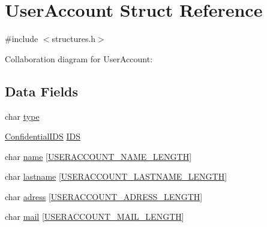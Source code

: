 \hypertarget{struct_user_account}{\section{User\-Account Struct Reference}
\label{struct_user_account}
}


{\ttfamily \#include $<$structures.\-h$>$}



Collaboration diagram for User\-Account\-:
\subsection*{Data Fields}
\begin{DoxyCompactItemize}
\item 
char \hyperlink{struct_user_account_aff17911edc8208aa8ddb1c7c52c78389}{type}
\item 
\hyperlink{struct_confidential_i_d_s}{Confidential\-I\-D\-S} \hyperlink{struct_user_account_a588d1e5ad85c65bc2b00e9432faadc0e}{I\-D\-S}
\item 
char \hyperlink{struct_user_account_ab3f0e8a7b7c292feb10bb01486452533}{name} \mbox{[}\hyperlink{defines_8h_a19e07c697a90c76dc929a297b857f607}{U\-S\-E\-R\-A\-C\-C\-O\-U\-N\-T\-\_\-\-N\-A\-M\-E\-\_\-\-L\-E\-N\-G\-T\-H}\mbox{]}
\item 
char \hyperlink{struct_user_account_a570366d76c40b10dee4a3db834bc53be}{lastname} \mbox{[}\hyperlink{defines_8h_af504a907ef57172c931bd86960095678}{U\-S\-E\-R\-A\-C\-C\-O\-U\-N\-T\-\_\-\-L\-A\-S\-T\-N\-A\-M\-E\-\_\-\-L\-E\-N\-G\-T\-H}\mbox{]}
\item 
char \hyperlink{struct_user_account_accd59deb6270e807cd96a582c141e631}{adress} \mbox{[}\hyperlink{defines_8h_adebc02c1bf42467bc097c05dfe461dc5}{U\-S\-E\-R\-A\-C\-C\-O\-U\-N\-T\-\_\-\-A\-D\-R\-E\-S\-S\-\_\-\-L\-E\-N\-G\-T\-H}\mbox{]}
\item 
char \hyperlink{struct_user_account_aa9bbf7bea4117b927642aee2875821d9}{mail} \mbox{[}\hyperlink{defines_8h_ab707ed00c5341acd2f33edf23891c34e}{U\-S\-E\-R\-A\-C\-C\-O\-U\-N\-T\-\_\-\-M\-A\-I\-L\-\_\-\-L\-E\-N\-G\-T\-H}\mbox{]}
\end{DoxyCompactItemize}


